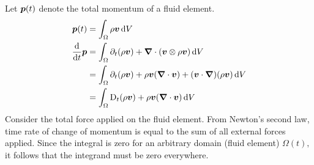 Let $\boldsymbol{p}(t)$ denote the total momentum of a fluid element.
\begin{equation}
\begin{split}
    \boldsymbol{p}(t) &= \int_{\Omega}\rho\boldsymbol{v}\,\mathrm{d} V \\
    \dfrac{\mathrm{d}}{\mathrm{d} t}\boldsymbol{p} &= \int_{\Omega}\partial_{t}(\rho\boldsymbol{v}) + \boldsymbol{\nabla}\cdot(\boldsymbol{v}\otimes\rho\boldsymbol{v})   \,\mathrm{d} V \\
    &=\int_{\Omega}\partial_{t}(\rho\boldsymbol{v}) + \rho\boldsymbol{v}(\boldsymbol{\nabla}\cdot\boldsymbol{v}) + (\boldsymbol{v}\cdot\boldsymbol{\nabla})(\rho\boldsymbol{v}) \,\mathrm{d} V \\
    &=\int_{\Omega}\mathrm{D}_{t}(\rho\boldsymbol{v}) + \rho\boldsymbol{v}(\boldsymbol{\nabla}\cdot\boldsymbol{v}) \,\mathrm{d} V
\end{split}
\end{equation}
Consider the total force applied on the fluid element.
From Newton's second law, time rate of change of momentum is equal to the sum of all external forces applied.
Since the integral is zero for an arbitrary domain (fluid element) $\Omega(t),$ it follows that the integrand must be zero everywhere.
